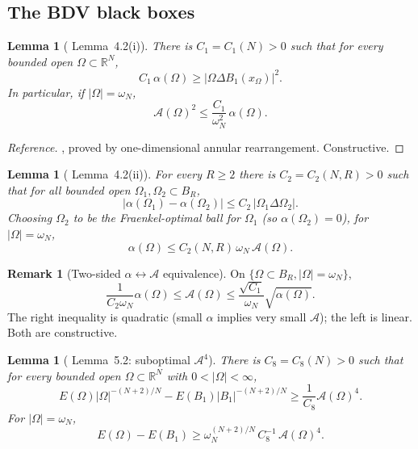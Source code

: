 \documentclass[11pt]{article}
\newtheorem{lemma}[theorem]{Lemma}
\theoremstyle{definition}
\newtheorem{remark}[theorem]{Remark}
\newcommand{\R}{\mathbb{R}}
\newcommand{\abs}[1]{\left|#1\right|}
\newcommand{\Fr}{\mathcal{A}}
\begin{document}
\subsection{The BDV black boxes}

\begin{lemma}[\cite{BDV} Lemma~4.2(i)]\label{lem:BDV42i}
There is $C_{1}=C_{1}(N)>0$ such that for every bounded open
$\Omega\subset\R^{N}$,
\[
   C_{1}\,\alpha(\Omega)\ge\abs{\Omega\Delta B_{1}(x_{\Omega})}^{2}.
\]
In particular, if $|\Omega|=\omega_{N}$,
\begin{equation}\label{eq:42i-Fr}
   \Fr(\Omega)^{2}\le\frac{C_{1}}{\omega_{N}^{2}}\,\alpha(\Omega).
\end{equation}
\end{lemma}

\begin{proof}[Reference]
\cite[Lemma~4.2(i)]{BDV}, proved by one-dimensional annular rearrangement.
Constructive.
\end{proof}

\begin{lemma}[\cite{BDV} Lemma~4.2(ii)]\label{lem:BDV42ii}
For every $R\ge 2$ there is $C_{2}=C_{2}(N,R)>0$ such that for all
bounded open $\Omega_{1},\Omega_{2}\subset B_{R}$,
\[
   \abs{\alpha(\Omega_{1})-\alpha(\Omega_{2})}
   \le C_{2}\,\abs{\Omega_{1}\Delta\Omega_{2}}.
\]
Choosing $\Omega_{2}$ to be the Fraenkel-optimal ball for $\Omega_{1}$
(so $\alpha(\Omega_{2})=0$), for $|\Omega|=\omega_{N}$,
\begin{equation}\label{eq:42ii-Fr}
   \alpha(\Omega)\le C_{2}(N,R)\,\omega_{N}\,\Fr(\Omega).
\end{equation}
\end{lemma}

\begin{remark}[Two-sided $\alpha\leftrightarrow\Fr$ equivalence]
\label{rem:two-sided}
On $\{\Omega\subset B_{R},|\Omega|=\omega_{N}\}$,
\[
   \frac{1}{C_{2}\omega_{N}}\alpha(\Omega)\le\Fr(\Omega)
   \le\frac{\sqrt{C_{1}}}{\omega_{N}}\sqrt{\alpha(\Omega)}.
\]
The right inequality is quadratic (small $\alpha$ implies very small
$\Fr$); the left is linear. Both are constructive.
\end{remark}

\begin{lemma}[\cite{BDV} Lemma~5.2: suboptimal $\Fr^{4}$]\label{lem:BDV52}
There is $C_{8}=C_{8}(N)>0$ such that for every bounded open
$\Omega\subset\R^{N}$ with $0<|\Omega|<\infty$,
\[
   E(\Omega)|\Omega|^{-(N+2)/N}-E(B_{1})|B_{1}|^{-(N+2)/N}
   \ge\frac{1}{C_{8}}\Fr(\Omega)^{4}.
\]
For $|\Omega|=\omega_{N}$,
\begin{equation}\label{eq:52-fixedvol}
   E(\Omega)-E(B_{1})\ge\omega_{N}^{(N+2)/N}\,C_{8}^{-1}\,\Fr(\Omega)^{4}.
\end{equation}
\end{lemma}
\end{document}
